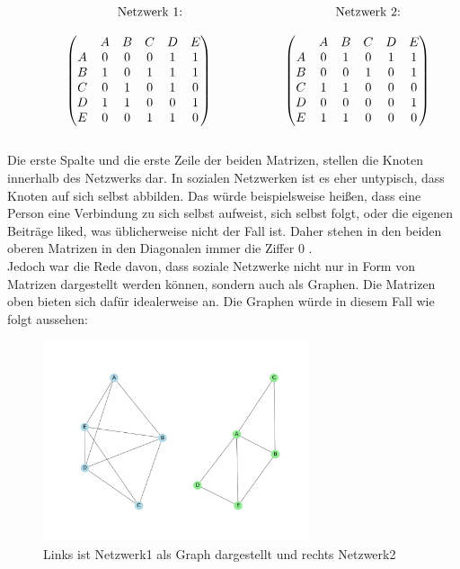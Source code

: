 \[
    \begin{array}{ccc} 
        \text{\hspace{-5.5cm}Netzwerk 1:} & \text{\hspace{-3cm}Netzwerk 2:} \\[\normalbaselineskip]
\begin{pmatrix}
& A & B & C & D & E\\
A & 0 & 0 & 0 & 1 & 1 \\
B & 1 & 0 & 1 & 1 & 1 \\
C & 0 & 1 & 0 & 1 & 0 \\
D & 1 & 1 & 0 & 0 & 1 \\
E & 0 & 0 & 1 & 1 & 0 \\
\end{pmatrix}
\hspace{2cm}
\begin{pmatrix}
& A & B & C & D & E\\
A & 0 & 1 & 0 & 1 & 1 \\
B & 0 & 0 & 1 & 0 & 1 \\
C & 1 & 1 & 0 & 0 & 0 \\
D & 0 & 0 & 0 & 0 & 1 \\
E & 1 & 1 & 0 & 0 & 0 \\
\end{pmatrix}
 \end{array} 
\]
\\
Die erste Spalte und die erste Zeile der beiden Matrizen, stellen die Knoten innerhalb des Netzwerks dar. In sozialen Netzwerken ist es eher untypisch, dass Knoten auf sich selbst abbilden. Das würde beispielsweise heißen, dass eine Person eine Verbindung zu sich selbst aufweist, sich selbst folgt, oder die eigenen Beiträge liked, was üblicherweise nicht der Fall ist. Daher stehen in den beiden oberen Matrizen in den Diagonalen immer die Ziffer $0$ \cite{wasserman1994social}.\\
Jedoch war die Rede davon, dass soziale Netzwerke nicht nur in Form von Matrizen dargestellt werden können, sondern auch als Graphen.
Die Matrizen oben bieten sich dafür idealerweise an. 
Die Graphen würde in diesem Fall wie folgt aussehen: 
\begin{figure}[h!]
    \centering
    \hspace*{-4cm}
    \includegraphics[width=0.7\textwidth]{Graphics/MatrixInNetwork.png}
    \caption{Links ist Netzwerk1 als Graph dargestellt und rechts Netzwerk2}\label{fig:MatrixInNetzwerk}
\end{figure}

